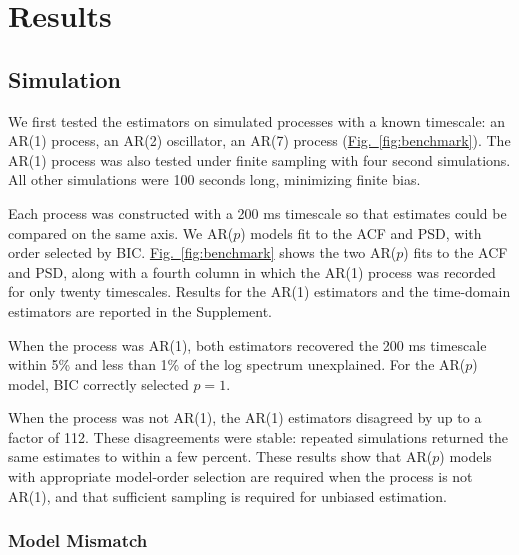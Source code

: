 \documentclass[pdflatex,sn-mathphys-num]{sn-jnl}
\newcommand{\figpanel}[2]{\hyperref[#1]{Fig.~\ref*{#1}#2}}
\begin{document}
\section{Results}\label{sec:results}

\subsection{Simulation}\label{sec:sim}

We first tested the estimators on simulated processes with a known timescale: an AR(1) process, an AR(2) oscillator, an AR(7) process (\figpanel{fig:benchmark}{}). The AR(1) process was also tested under finite sampling with four second simulations. All other simulations were 100 seconds long, minimizing finite bias.

Each process was constructed with a 200 ms timescale so that estimates could be compared on the same axis. We AR($p$) models fit to the ACF and PSD, with order selected by BIC. \figpanel{fig:benchmark}{} shows the two AR($p$) fits to the ACF and PSD, along with a fourth column in which the AR(1) process was recorded for only twenty timescales. Results for the AR(1) estimators and the time-domain estimators are reported in the Supplement.

When the process was AR(1), both estimators recovered the 200 ms timescale within 5\% and less than 1\% of the log spectrum unexplained. For the AR($p$) model, BIC correctly selected $p = 1$.

When the process was not AR(1), the AR(1) estimators disagreed by up to a factor of 112. These disagreements were stable: repeated simulations returned the same estimates to within a few percent. These results show that AR($p$) models with appropriate model-order selection are required when the process is not AR(1), and that sufficient sampling is required for unbiased estimation.

\subsubsection{Model Mismatch}\label{sec:modes}
\end{document}
